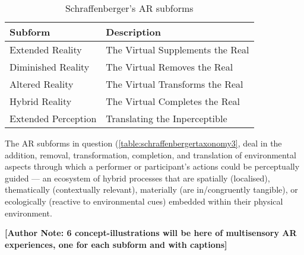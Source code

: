 \begin{table}
    \centering
    \begin{tabular}{ l l }
        \toprule
        Subform             & Description                       \\
        \midrule
        Extended Reality    & The Virtual Supplements the Real  \\
        Diminished Reality  & The Virtual Removes the Real      \\
        Altered Reality     & The Virtual Transforms the Real   \\
        Hybrid Reality      & The Virtual Completes the Real    \\
        Extended Perception & Translating the Inperceptible     \\
        \bottomrule
    \end{tabular}
    \caption{Schraffenberger's AR subforms}\label{table:schraffenbergertaxonomy3}
\end{table}

The AR subforms in question (\autoref{table:schraffenbergertaxonomy3}, deal in the addition, removal, transformation, completion, and translation of environmental aspects through which a performer or participant’s actions could be perceptually guided — an ecosystem of hybrid processes that are spatially (localised), thematically (contextually relevant), materially (are in/congruently tangible), or ecologically (reactive to environmental cues) embedded within their physical environment.

\textbf{[Author Note: 6 concept-illustrations will be here of multisensory AR experiences, one for each subform and with captions]}

